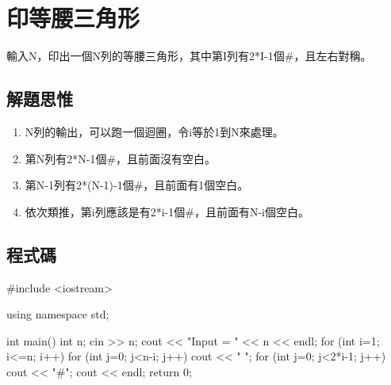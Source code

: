 \section{印等腰三角形}
輸入N，印出一個N列的等腰三角形，其中第I列有2*I-1個\#，且左右對稱。

\subsection{解題思惟}
\begin{enumerate}
	\item N列的輸出，可以跑一個迴圈，令i等於1到N來處理。
	\item 第N列有2*N-1個\#，且前面沒有空白。
	\item 第N-1列有2*(N-1)-1個\#，且前面有1個空白。
	\item 依次類推，第i列應該是有2*i-1個\#，且前面有N-i個空白。
\end{enumerate}
			
\subsection{程式碼}
\begin{cppcode}
#include <iostream>

using namespace std;

int main()
{
	int n;
	cin >> n;
	cout << "Input = " << n << endl;
	for (int i=1; i<=n; i++) {
		for (int j=0; j<n-i; j++) cout << " ";
		for (int j=0; j<2*i-1; j++) cout << "#";
		cout << endl;
	}
	return 0;
}
\end{cppcode}
